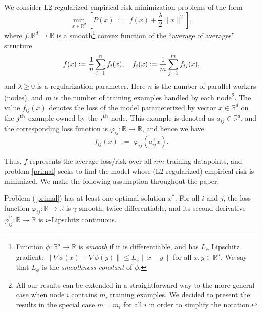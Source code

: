\documentclass[12pt]{article}
\newcommand{\squeeze}{}
\newcommand{\eqdef}{\; { := }\;}
\newcommand{\R}{\mathbb{R}}
\begin{document}
We consider L2 regularized empirical risk minimization problems of the form
\begin{equation}\label{primal}
\squeeze 
\min \limits_{x\in \mathbb{R}^d} \left[ P(x) \eqdef f(x) + \frac{\lambda}{2}\|x\|^2  \right],
\end{equation}
where $f:\R^d \to \R$ is a smooth\footnote{Function $\phi:\R^d\to \R$ is {\em smooth} if it is differentiable, and has $L_\phi$ Lipschitz gradient: $\|\nabla \phi(x)- \nabla \phi(y)\| \leq L_\phi  \|x-y\|$ for all $x,y\in \R^d$. We say that $L_\phi$ is the {\em smoothness constant} of $\phi$.} convex function of the ``average of averages'' structure
\begin{equation} \label{eq:f_and_f_i} 
 \squeeze f(x) \eqdef\frac{1}{n}\sum \limits_{i=1}^n  f_i(x), \quad f_i(x) \eqdef \frac{1}{m} \sum \limits \limits_{j=1}^{m} f_{ij}(x), \end{equation}
and $\lambda\geq 0$ is a regularization parameter. Here $n$ is the number of parallel workers (nodes), and $m$ is the number of training examples handled by each node\footnote{All our results can be extended in a straightforward way to the more general case when node $i$ contains $m_i$ training examples. We decided to present the results in the special case $m=m_i$ for all $i$ in order to simplify the notation. }.  
The value $f_{ij}(x)$ denotes the loss of the model parameterized by vector $x\in \R^d$ on the $j^{\rm th}$ example owned by the $i^{\rm th}$ node. This example is denoted as $a_{ij} \in \R^d$, and the corresponding loss function is $\varphi_{ij}:\R \to \R$, and hence we have
\begin{equation}\label{eq:f_ij} f_{ij}(x) \eqdef \varphi_{ij}(a_{ij}^\top x).\end{equation}

Thus, $f$ represents the average loss/risk over all $nm$ training datapoints, and problem \eqref{primal} seeks to find the model whose (L2 regularized) empirical risk is minimized. We make the following assumption throughout the paper. 
\begin{assumption}\label{as:general}
Problem (\ref{primal}) has at least one optimal solution $x^*$. For all  $i$ and $j$, the loss function $\varphi_{ij}: \mathbb{R} \to \mathbb{R}$ is $\gamma$-smooth, twice differentiable, and its second derivative $\varphi_{ij}^{\prime\prime} : \R \to \R$ is $\nu$-Lipschitz continuous.
\end{assumption} 
\end{document}
